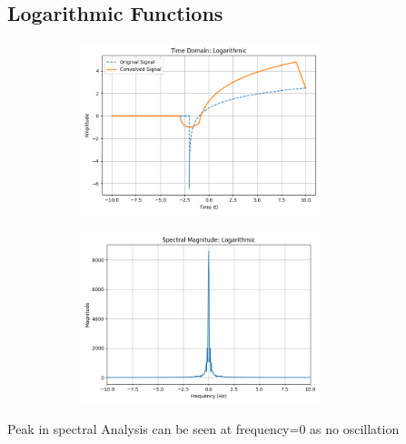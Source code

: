 \documentclass[a4paper,12pt]{article}
\begin{document}
\subsection*{Logarithmic Functions}
\begin{figure}[H]
    \centering
    \begin{subfigure}{0.5\textwidth}
        \centering
        \includegraphics[height=5cm]{figs/Analysis6.png}
    \end{subfigure}%
    \begin{subfigure}{0.5\textwidth}
        \centering
        \includegraphics[height=5cm]{figs/Analysis7.png}
    \end{subfigure}
\end{figure}
Peak in spectral Analysis can be seen at frequency=0 as no oscillation
\end{document}
